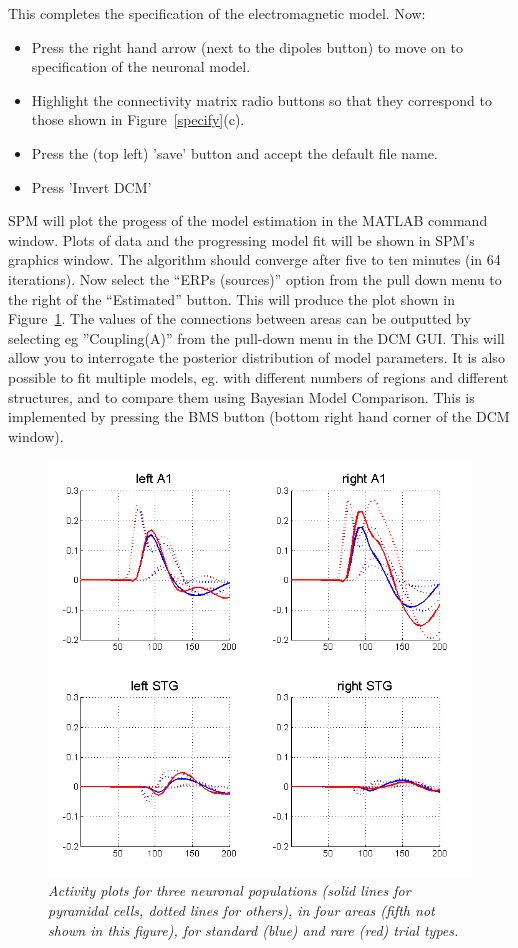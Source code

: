 This completes the specification of the electromagnetic model. Now:
\begin{itemize}
\item{Press the right hand arrow (next to the dipoles button) to move on to specification of the neuronal model.}
\item{Highlight the connectivity matrix radio buttons so that they  correspond to those shown in Figure~\ref{specify}(c).}
\item{Press the (top left) 'save' button and accept the default file name.}
\item{Press 'Invert DCM'}
\end{itemize}
SPM will plot the progess of the model estimation in the MATLAB command window. Plots of data and the progressing model fit will be shown in SPM's graphics window. The algorithm should converge after five to ten minutes (in 64 iterations). Now select the ``ERPs (sources)'' option from the pull down menu to the right of the ``Estimated'' button. This will produce the plot shown in Figure~\ref{source_erps}. The values of the connections between areas can be outputted by selecting eg ''Coupling(A)'' from the pull-down menu in the DCM GUI. This will allow you to interrogate the posterior distribution of model parameters. It is also possible to fit multiple models, eg. with different numbers of regions and different structures, and to compare them using Bayesian Model Comparison. This is implemented by pressing the BMS button (bottom right hand corner of the DCM window).

\begin{figure}
\begin{center}
\includegraphics[width=120mm]{mmn/source_erps}
\caption{\em Activity plots for three neuronal populations (solid lines for pyramidal cells, dotted lines for others), in four areas (fifth not shown in this figure), for standard (blue) and rare (red) trial types.
\label{source_erps} }
\end{center}
\end{figure}
